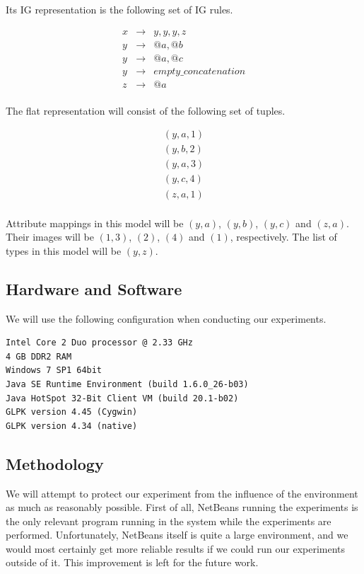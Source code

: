 Its IG representation is the following set of IG rules.

\begin{eqnarray*}
	x & \to & y, y, y, z \\
	y & \to & @a, @b \\
	y & \to & @a, @c \\
	y & \to & empty\_concatenation \\
	z & \to & @a \\
\end{eqnarray*}

The flat representation will consist of the following set of tuples.

\begin{eqnarray*}
(y, a, 1) \\
(y, b, 2) \\
(y, a, 3) \\
(y, c, 4) \\
(z, a, 1) \\
\end{eqnarray*}

Attribute mappings in this model will be $(y, a)$, $(y, b)$, $(y,c)$ and $(z,a)$. Their images will be $(1,3)$, $(2)$, $(4)$ and $(1)$, respectively. The list of types in this model will be $(y,z)$.

\subsection{Hardware and Software}

We will use the following configuration when conducting our experiments.

\begin{verbatim}
Intel Core 2 Duo processor @ 2.33 GHz
4 GB DDR2 RAM
Windows 7 SP1 64bit
Java SE Runtime Environment (build 1.6.0_26-b03)
Java HotSpot 32-Bit Client VM (build 20.1-b02)
GLPK version 4.45 (Cygwin)
GLPK version 4.34 (native)
\end{verbatim}

\subsection{Methodology}

We will attempt to protect our experiment from the influence of the environment as much as reasonably possible. First of all, NetBeans running the experiments is the only relevant program running in the system while the experiments are performed. Unfortunately, NetBeans itself is quite a large environment, and we would most certainly get more reliable results if we could run our experiments outside of it. This improvement is left for the future work.

